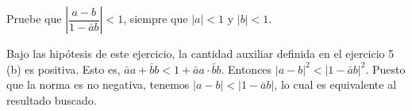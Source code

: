\begin{exercise}
Pruebe que $\left| \dfrac {a - b} {1 - \bar ab} \right| < 1$, siempre que $|a| < 1$ y $|b| < 1$.
\end{exercise}

\begin{solution}
Bajo las hipótesis de este ejercicio, la cantidad auxiliar definida en el ejercicio 5 (b) es positiva. Esto es, $\bar aa + \bar bb < 1 + \bar aa \cdot \bar bb$. Entonces $|a - b|^2 < |1 - \bar ab|^2$. Puesto que la norma es no negativa, tenemos $|a - b| < |1 - \bar ab|$, lo cual es equivalente al resultado buscado. 
\end{solution}
